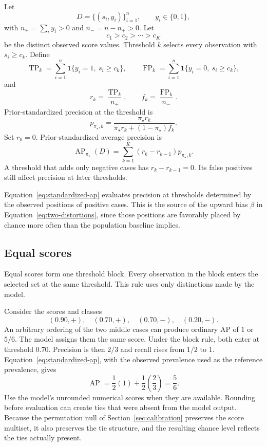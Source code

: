 \documentclass[11pt]{article}
\newcommand{\AP}{\operatorname{AP}}
\theoremstyle{remark}
\begin{document}
Let
\[
D=\{(s_i,y_i)\}_{i=1}^{n},
\qquad y_i\in\{0,1\},
\]
with $n_+=\sum_i y_i>0$ and $n_-=n-n_+>0$. Let
\[
c_1>c_2>\cdots>c_K
\]
be the distinct observed score values. Threshold $k$ selects every observation with $s_i\geq c_k$. Define
\[
\operatorname{TP}_k
=
\sum_{i=1}^{n}\mathbf{1}\{y_i=1,\ s_i\geq c_k\},
\qquad
\operatorname{FP}_k
=
\sum_{i=1}^{n}\mathbf{1}\{y_i=0,\ s_i\geq c_k\},
\]
and
\[
r_k=\frac{\operatorname{TP}_k}{n_+},
\qquad
f_k=\frac{\operatorname{FP}_k}{n_-}.
\]
Prior-standardized precision at the threshold is
\begin{equation}
p_{\pi_\star,k}
=
\frac{\pi_\star r_k}
{\pi_\star r_k+(1-\pi_\star)f_k}.
\label{eq:empirical-reference-precision}
\end{equation}
Set $r_0=0$. Prior-standardized average precision is
\begin{equation}
\AP_{\pi_\star}(D)
=
\sum_{k=1}^{K}
(r_k-r_{k-1})p_{\pi_\star,k}.
\label{eq:standardized-ap}
\end{equation}
A threshold that adds only negative cases has $r_k-r_{k-1}=0$. Its false positives still affect precision at later thresholds.

Equation~\eqref{eq:standardized-ap} evaluates precision at thresholds determined by the observed positions of positive cases. This is the source of the upward bias $\beta$ in Equation~\eqref{eq:two-distortions}, since those positions are favorably placed by chance more often than the population baseline implies.

\subsection{Equal scores}

Equal scores form one threshold block. Every observation in the block enters the selected set at the same threshold. This rule uses only distinctions made by the model.

Consider the scores and classes
\[
(0.90,+),\quad(0.70,+),\quad(0.70,-),\quad(0.20,-).
\]
An arbitrary ordering of the two middle cases can produce ordinary AP of $1$ or $5/6$. The model assigns them the same score. Under the block rule, both enter at threshold $0.70$. Precision is then $2/3$ and recall rises from $1/2$ to $1$. Equation~\eqref{eq:standardized-ap}, with the observed prevalence used as the reference prevalence, gives
\[
\AP
=
\frac12(1)+\frac12\left(\frac23\right)
=
\frac56.
\]
Use the model's unrounded numerical scores when they are available. Rounding before evaluation can create ties that were absent from the model output. Because the permutation null of Section~\ref{sec:calibration} preserves the score multiset, it also preserves the tie structure, and the resulting chance level reflects the ties actually present.
\end{document}
